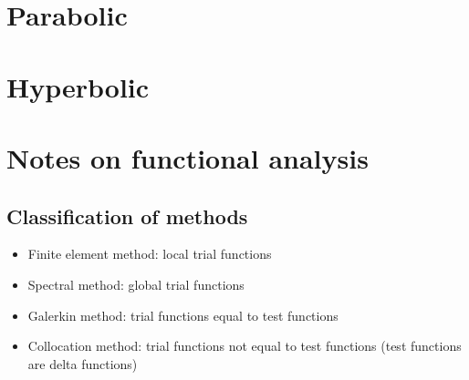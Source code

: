 \documentclass[oneside,a4paper,11pt]{report}
\begin{document}
\chapter{Parabolic}

\chapter{Hyperbolic}

\appendix
\chapter{Notes on functional analysis}

\section{Classification of methods}
\begin{itemize}
    \item Finite element method: local trial functions
    \item Spectral method: global trial functions
    \item Galerkin method: trial functions equal to test functions
    \item Collocation method: trial functions not equal to test functions (test functions are delta functions)
\end{itemize}

\end{document}
